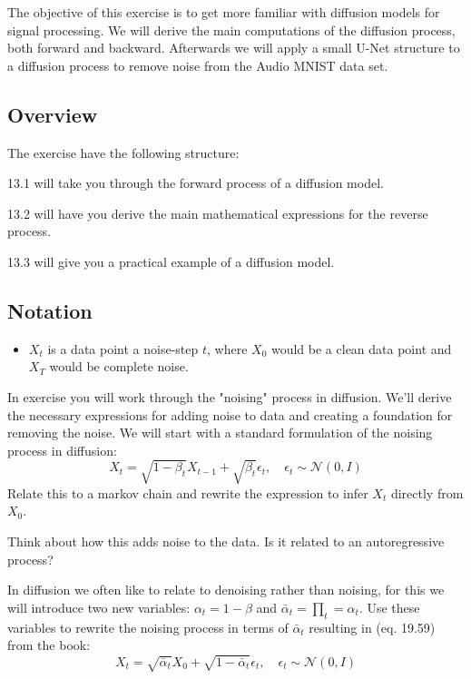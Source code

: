 \documentclass[12pt]{article}    %
\begin{document}


The objective of this exercise is to get more familiar with diffusion models for signal processing. We will derive the main computations of the diffusion process, both forward and backward.
Afterwards we will apply a small U-Net structure to a diffusion process to remove noise from the Audio MNIST data set.

\subsection*{Overview}
The exercise have the following structure:

13.1 will take you through the forward process of a diffusion model.

13.2 will have you derive the main mathematical expressions for the reverse process.

13.3 will give you a practical example of a diffusion model.

\subsection*{Notation}
\begin{itemize} 
  \item $X_t$ is a data point a noise-step $t$, where $X_0$ would be a clean data point and $X_T$ would be complete noise.
\end{itemize}

In exercise you will work through the "noising" process in diffusion. 
We'll derive the necessary expressions for adding noise to data and creating a foundation for removing the noise.
\exminor
We will start with a standard formulation of the noising process in diffusion:
\begin{equation} \label{eq:basic-diffusion}
    X_t = \sqrt{1-\beta_t} X_{t-1} + \sqrt{\beta_t} \epsilon_t, \quad \epsilon_t \sim \mathcal{N}(0,I)
\end{equation} 
Relate this to a markov chain and rewrite the expression to infer $X_t$ directly from $X_0$.

Think about how this adds noise to the data. Is it related to an autoregressive process?

\exminorhard
In diffusion we often like to relate to denoising rather than noising, for this we will introduce two new variables: $\alpha_t = 1 - \beta$ and $\bar{\alpha}_t = \prod_t = \alpha_t$.
Use these variables to rewrite the noising process in terms of $\bar{\alpha}_t$ resulting in (eq. 19.59) from the book:
\begin{equation} \label{eq:forward-process}
    X_t = \sqrt{\bar{\alpha}_t}X_0+\sqrt{1-\bar{\alpha}_t} \epsilon_t, \quad \epsilon_t \sim \mathcal{N}(0,I)
\end{equation}
\end{document}
